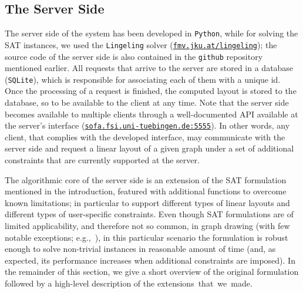 \documentclass[runningheads]{llncs}
\newcommand\rurl[1]{\href{http://#1}{\nolinkurl{#1}}}
\begin{document}
\subsection{The Server Side}\label{subsec:server}

The server side of the system has been developed in \texttt{Python}, while for solving the SAT instances, we used the \texttt{Lingeling} solver (\rurl{fmv.jku.at/lingeling}); the source code of the server side is also contained in the \texttt{github} repository mentioned earlier. All requests that arrive to the server are stored in a database (\texttt{SQLite}), which is responsible for associating each of them with a unique id. Once the processing of a request is finished, the computed layout is stored to the database, so to be available to the client at any time. Note that the server side becomes available to multiple clients through a well-documented API available at the server's interface (\rurl{sofa.fsi.uni-tuebingen.de:5555}).
%
%
In other words, any client, that complies with the developed interface, may communicate with the server side and request a linear layout of a given graph under a set of additional constraints that are currently supported at the server. 

The algorithmic core of the server side is an extension of the SAT formulation~\cite{DBLP:conf/gd/Bekos0Z15} mentioned in the introduction, featured with additional functions to overcome known limitations; in particular to support  different types of linear layouts and different types of user-specific constraints. Even though SAT formulations are of limited applicability, and therefore not so common, in graph drawing (with few notable exceptions; e.g.,~\cite{DBLP:conf/gd/BiedlBNNPR13,DBLP:conf/gd/ChimaniZ12,DBLP:conf/gd/GangeSM10}), in this particular scenario the formulation is robust enough to solve non-trivial instances in reasonable amount of time (and, as expected, its performance increases when additional constraints are imposed). In the remainder of this section, we give a short overview of the original formulation followed by a high-level description of the extensions~that~we~made. 
\end{document}
